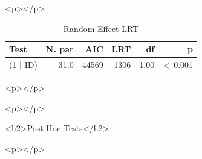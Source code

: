 \documentclass[a4paper,man,hidelinks,floatsintext]{apa7}
\begin{document}
        <p></p>
      
    
\begin{table}[!htbp]
\caption{Random Effect LRT}
\label{tab:Table_5}
\begin{adjustbox}{max size={\columnwidth}{\textheight}}
\centering
\begin{tabular}{lrrrrr}
\hline
Test     & N. par &   AIC &  LRT &   df &               p \\
\hline
(1 | ID) &   31.0 & 44569 & 1306 & 1.00 & \textless~0.001 \\
\hline
\end{tabular}
\end{adjustbox}
\begin{tablenotes} {
\small
}
\end{tablenotes}
\end{table}
      
        <p></p>
      
    
      
      
    
      
        <p></p>
      
    <h2>Post Hoc Tests</h2>
      
        <p></p>
      
\end{document}
